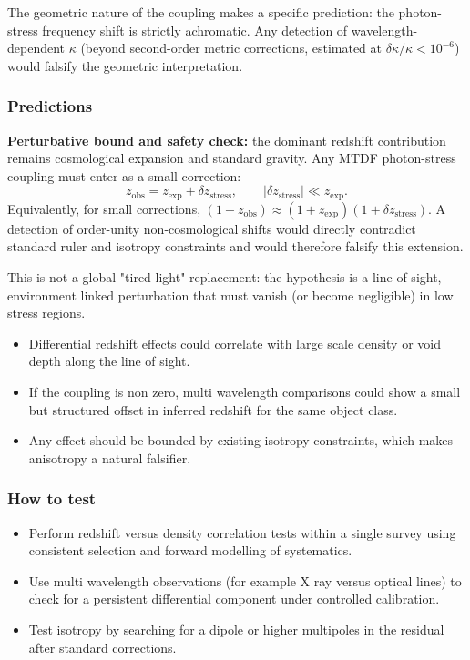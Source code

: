 \documentclass[11pt,a4paper]{article}
\begin{document}
The geometric nature of the coupling makes a specific prediction: the photon-stress frequency shift is strictly achromatic. Any detection of wavelength-dependent \(\kappa\) (beyond second-order metric corrections, estimated at \(\delta\kappa/\kappa < 10^{-6}\)) would falsify the geometric interpretation.

\subsubsection{Predictions}
\textbf{Perturbative bound and safety check:} the dominant redshift contribution remains cosmological expansion and standard gravity.
Any MTDF photon-stress coupling must enter as a small correction:
\[
z_{\mathrm{obs}} = z_{\mathrm{exp}} + \delta z_{\mathrm{stress}}, \qquad \lvert \delta z_{\mathrm{stress}}\rvert \ll z_{\mathrm{exp}}.
\]
Equivalently, for small corrections, \( (1+z_{\mathrm{obs}}) \approx (1+z_{\mathrm{exp}})(1+\delta z_{\mathrm{stress}}) \).
A detection of order-unity non-cosmological shifts would directly contradict standard ruler and isotropy constraints and would therefore falsify this extension.

This is not a global "tired light" replacement: the hypothesis is a line-of-sight, environment linked perturbation that must vanish (or become negligible) in low stress regions.

\begin{itemize}
  \item Differential redshift effects could correlate with large scale density or void depth along the line of sight.
  \item If the coupling is non zero, multi wavelength comparisons could show a small but structured offset in inferred redshift for the same object class.
  \item Any effect should be bounded by existing isotropy constraints, which makes anisotropy a natural falsifier.
\end{itemize}

\subsubsection{How to test}
\begin{itemize}
  \item Perform redshift versus density correlation tests within a single survey using consistent selection and forward modelling of systematics.
  \item Use multi wavelength observations (for example X ray versus optical lines) to check for a persistent differential component under controlled calibration.
  \item Test isotropy by searching for a dipole or higher multipoles in the residual after standard corrections.
\end{itemize}
\end{document}
